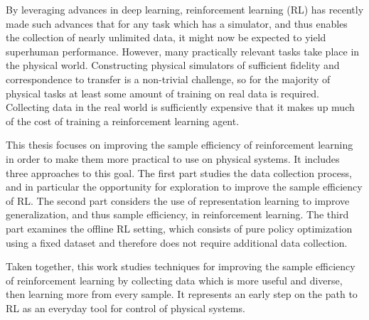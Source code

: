 By leveraging advances in deep learning, reinforcement learning (RL) has recently made such advances that for any task which has a simulator, and thus enables the collection of nearly unlimited data, it might now be expected to yield superhuman performance.
However, many practically relevant tasks take place in the physical world.
Constructing physical simulators of sufficient fidelity and correspondence to transfer is a non-trivial challenge, so for the majority of physical tasks at least some amount of training on real data is required.
Collecting data in the real world is sufficiently expensive that it makes up much of the cost of training a reinforcement learning agent.

This thesis focuses on improving the sample efficiency of reinforcement learning in order to make them more practical to use on physical systems.
It includes three approaches to this goal.
The first part studies the data collection process, and in particular the opportunity for exploration to improve the sample efficiency of RL.
The second part considers the use of representation learning to improve generalization, and thus sample efficiency, in reinforcement learning.
The third part examines the offline RL setting, which consists of pure policy optimization using a fixed dataset and therefore does not require additional data collection.

Taken together, this work studies techniques for improving the sample efficiency of reinforcement learning by collecting data which is more useful and diverse, then learning more from every sample.
It represents an early step on the path to RL as an everyday tool for control of physical systems.





